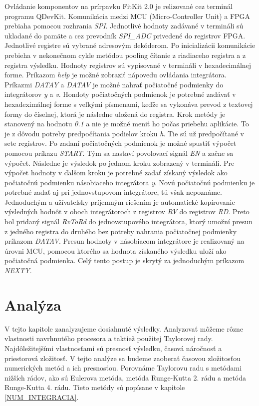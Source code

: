 Ovládanie komponentov na prírpavku FitKit 2.0 je relizované cez terminál programu QDevKit. Komunikácia medzi MCU (Micro-Controller Unit) a FPGA prebiaha pomocou rozhrania \textit{SPI}. Jednotlivé hodnoty zadávané v termináli sú ukladané do pamäte a cez prevodník \textit{SPI\_ADC} privedené do registrov FPGA. Jednotlivé registre sú vybrané adresovým dekóderom. Po inicializácii komunikácie prebieha v nekonečnom cykle metódou pooling čítanie z riadiaceho registra a z registra výsledku. Hodnoty registrov sú vypisované v termináli v hexadecimálnej forme. Príkazom \textit{help} je možné zobraziť nápovedu ovládania integrátora. Príkazmi \textit{DATAY} a \textit{DATAV} je možné nahrať počiatočné podmienky do integrátorov \textit{y} a \textit{v}. Hondoty počiatočných podmienok je potrebné zadávať v hexadeximálnej forme s veľkými písmenami, keďže sa vykonáva prevod z textovej formy do číselnej, ktorá je následne uložená do registra. Krok metódy je stanovený na hodnotu \textit{0.1} a nie je možné meniť ho počas priebehu aplikácie. To je z dôvodu potreby predpočítania podielov kroku \textit{h}. Tie sú už predpočítané v sete registrov. Po zadaní počiatočných podmienok je možné spustiť výpočet pomocou príkazu \textit{START}. Tým sa nastaví povolovací signál \textit{EN} a začne sa výpočet. Následne je výsledok po jednom kroku zobrazený v termináli. Pre výpočet hodnoty v ďalšom kroku je potrebné zadať získaný výsledok ako počiatočnú podmienku násobiaceho integrátora \textit{y}. Novú počiatočnú podmienku je potrebné zadať aj pri jednovstupovom integrátore, tú však nepoznáme. Jednoduchým a užívateľsky príjemným riešením je automatické kopírovanie výsledných hodnôt v oboch integrátoroch z registrov \textit{RV} do registrov \textit{RD}. Preto bol pridaný signál \textit{RvToRd} do jednovstupového integrátora, ktorý umožní presun z jedného registra do druhého bez potreby nahrania počiatočnej podmienky príkazom \textit{DATAV}. Presun hodnoty v násobiacom integrátore je realizovaný na úrovni MCU, pomocou ktorého sa hodnota získaného výsledku uloží ako počiatočná podmienka. Celý tento postup je skrytý za jednoduchým príkazom \textit{NEXTY}.


\chapter{Analýza} \label{ANALYZA}
V tejto kapitole zanalyzujeme dosiahnuté výsledky. Analyzovať môžeme rôzne vlastnosti navrhnutého procesora a taktiež použitej Taylorovej rady. Najdôležitejšími vlastnosťami sú presnosť výsledku, časová náročnosť a priestorová zložitosť. V tejto analýze sa budeme zaoberať časovou zložitosťou numerických metód a ich presnosťou. Porovnáme Taylorovu radu s metódami nižších rádov, ako sú Eulerova metóda, metóda Runge-Kutta 2. rádu a metóda Runge-Kutta 4. rádu. Tieto metódy sú popísane v kapitole \ref{NUM_INTEGRACIA}.

